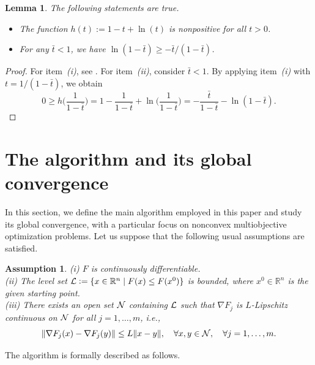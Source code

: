 \documentclass[11pt]{article}
\newtheorem{lemma}[theorem]{Lemma}
\newtheorem{assumption}{Assumption}[section]
\numberwithin{assumption}{section}
\newcommand{\R}{\mathbb{R}}
\newcommand{\Ls}{{\cal{L}}}
\begin{document}
\begin{lemma} \label{l:natal}
The following statements are true.
\begin{itemize}
\item[(i)] The function $h(t):=1-t+\ln(t)$ is nonpositive for all $t>0$.
\item[(ii)] For any $\bar{t}<1$, we have $\ln(1-\bar{t})\geq -\bar{t}/(1-\bar{t})$.
\end{itemize}
\end{lemma}
\begin{proof}
For item~{\it (i)}, see \cite[Exercise 6.8]{NoceWrig06}. For item~{\it (ii)}, consider $\bar{t}<1$. By applying item~{\it (i)} with $t=1/(1-\bar{t})$, we obtain
\[0\geq h\Big(\dfrac{1}{1-\bar{t}}\Big)=1-\dfrac{1}{1-\bar{t}}+\ln\Big(\dfrac{1}{1-\bar{t}}\Big)=-\dfrac{\bar{t}}{1-\bar{t}}-\ln(1-\bar{t}).\]
\end{proof}
  
\section{The algorithm and its global convergence}   \label{sec:algorithm}

In this section, we define the main algorithm employed in this paper and study its global convergence, with a particular focus on nonconvex multiobjective optimization problems.
Let us suppose that the following usual assumptions are satisfied.

\begin{assumption}\label{assumption1} 
\textit{(i)} $F$ is continuously differentiable.\\
\textit{(ii)}  The level set $\Ls:=\{x\in\R^n\mid F(x)\leq F(x^0)\}$ is bounded, where $x^0\in\R^n$ is the given starting point.\\
\textit{(iii)} There exists an open set ${\cal N}$ containing $\Ls$ such that $\nabla F_j$ is $L$-Lipschitz continuous on ${\cal N}$ for all $j = 1, \dots, m$, i.e.,
$$\|\nabla F_j(x)-\nabla F_j(y)\|\leq L \|x-y\|, \quad \forall x,y\in{\cal N}, \quad \forall j = 1,\ldots,m.$$
\end{assumption}

The algorithm is formally described as follows.
\end{document}
